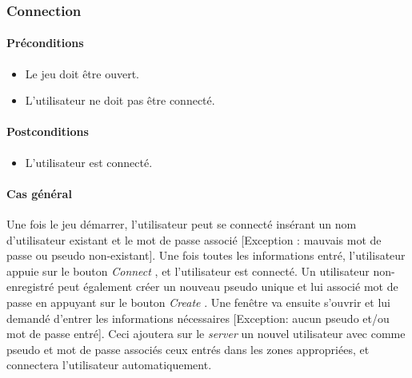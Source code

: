 \documentclass[a4paper,11pt]{report}
\begin{document}
\subsubsection{Connection}
\paragraph{Préconditions}
\begin{itemize}
 \item Le jeu doit être ouvert.
 \item L'utilisateur ne doit pas être connecté.
\end{itemize}
\paragraph{Postconditions}
\begin{itemize}
 \item L'utilisateur est connecté.
\end{itemize}
\paragraph{Cas général}
Une fois le jeu démarrer, l'utilisateur peut se connecté insérant un nom d'utilisateur existant et le mot de passe associé
[Exception : mauvais mot de passe ou pseudo non-existant].
Une fois toutes les informations entré, l'utilisateur appuie sur le bouton \og \textit{Connect} \fg, et l'utilisateur est
connecté. Un utilisateur non-enregistré peut également créer un nouveau pseudo unique
et lui associé mot de passe en appuyant sur le bouton \og \textit{Create} .
Une fenêtre va ensuite s'ouvrir et lui demandé d'entrer les informations nécessaires 
[Exception: aucun pseudo et/ou mot de passe entré]. Ceci ajoutera sur le \textit{server} un nouvel utilisateur avec comme
pseudo et mot de passe associés ceux entrés dans les zones appropriées, et connectera l'utilisateur automatiquement.
\end{document}
